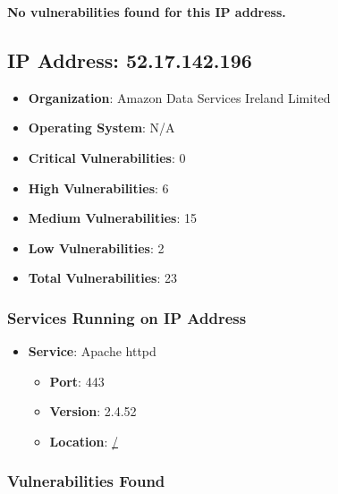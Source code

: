 \documentclass{article}
\begin{document}
\textbf{No vulnerabilities found for this IP address.}




\clearpage



\subsection{IP Address: 52.17.142.196}

\begin{itemize}
    \item \textbf{Organization}: Amazon Data Services Ireland Limited
    \item \textbf{Operating System}:  N/A 
    \item \textbf{Critical Vulnerabilities}: 0
    \item \textbf{High Vulnerabilities}: 6
    \item \textbf{Medium Vulnerabilities}: 15
    \item \textbf{Low Vulnerabilities}: 2
    \item \textbf{Total Vulnerabilities}: 23
\end{itemize}

\subsubsection*{Services Running on IP Address}

\begin{itemize}
    
        \item \textbf{Service}: Apache httpd
        \begin{itemize}
            \item \textbf{Port}: 443
            \item \textbf{Version}:  2.4.52 
            \item \textbf{Location}: \href{ / }{ / }
        \end{itemize}
    
\end{itemize}


\subsubsection*{Vulnerabilities Found}
\end{document}
